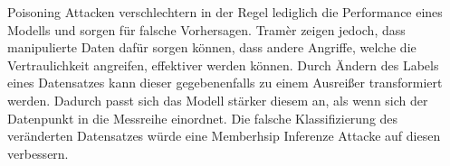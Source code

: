 Poisoning Attacken verschlechtern in der Regel lediglich die Performance eines Modells und sorgen für falsche Vorhersagen.
Tramèr \etal \cite{P-14} zeigen jedoch, dass manipulierte Daten dafür sorgen können, dass andere Angriffe, welche die Vertraulichkeit angreifen, effektiver werden können.
Durch Ändern des Labels eines Datensatzes kann dieser gegebenenfalls zu einem Ausreißer transformiert werden. 
Dadurch passt sich das Modell stärker diesem an, als wenn sich der Datenpunkt in die Messreihe einordnet.
Die falsche Klassifizierung des veränderten Datensatzes würde eine Memberhsip Inferenze Attacke auf diesen verbessern.
